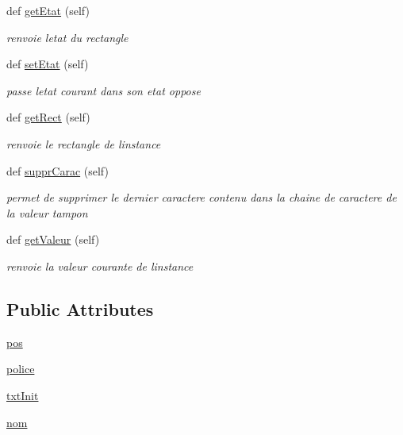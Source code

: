 \begin{DoxyCompactItemize}
def \hyperlink{classaffichage_1_1rect_modifier_variables_a8d4bd75d18102f0b3c93da2f40cc3c48}{get\+Etat} (self)
\begin{DoxyCompactList}\small\item\em renvoie l\textquotesingle{}etat du rectangle \end{DoxyCompactList}\item 
def \hyperlink{classaffichage_1_1rect_modifier_variables_ac911462911dcfaf7f42ade3202b71d46}{set\+Etat} (self)
\begin{DoxyCompactList}\small\item\em passe l\textquotesingle{}etat courant dans son etat oppose \end{DoxyCompactList}\item 
def \hyperlink{classaffichage_1_1rect_modifier_variables_a475182511e9c8824f4086dc4b7c8468c}{get\+Rect} (self)
\begin{DoxyCompactList}\small\item\em renvoie le rectangle de l\textquotesingle{}instance \end{DoxyCompactList}\item 
def \hyperlink{classaffichage_1_1rect_modifier_variables_add25dd453e03aee3377fa7d294704d24}{suppr\+Carac} (self)
\begin{DoxyCompactList}\small\item\em permet de supprimer le dernier caractere contenu dans la chaine de caractere de la valeur tampon \end{DoxyCompactList}\item 
def \hyperlink{classaffichage_1_1rect_modifier_variables_a48e2b04c5ff8819ed709eb32f6708d80}{get\+Valeur} (self)
\begin{DoxyCompactList}\small\item\em renvoie la valeur courante de l\textquotesingle{}instance \end{DoxyCompactList}\end{DoxyCompactItemize}
\subsection*{Public Attributes}
\begin{DoxyCompactItemize}
\item 
\hyperlink{classaffichage_1_1rect_modifier_variables_a35d142e0546decd4b8a60133a8d8687f}{pos}
\item 
\hyperlink{classaffichage_1_1rect_modifier_variables_a1d316c60225d933527e6e94ce5c87515}{police}
\item 
\hyperlink{classaffichage_1_1rect_modifier_variables_abf231c24af86a4b80c5ccb79d441189b}{txt\+Init}
\item 
\hyperlink{classaffichage_1_1rect_modifier_variables_a114612fb3a86a4b8c311170e37146b31}{nom}
\end{DoxyCompactItemize}


